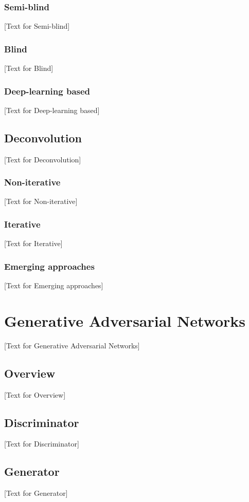 \subsubsection{Semi-blind}
[Text for Semi-blind]

\subsubsection{Blind}
[Text for Blind]

\subsubsection{Deep-learning based}
[Text for Deep-learning based]

\subsection{Deconvolution}
[Text for Deconvolution]

\subsubsection{Non-iterative}
[Text for Non-iterative]

\subsubsection{Iterative}
[Text for Iterative]

\subsubsection{Emerging approaches}
[Text for Emerging approaches]

\section{Generative Adversarial Networks}
[Text for Generative Adversarial Networks]

\subsection{Overview}
[Text for Overview]

\subsection{Discriminator}
[Text for Discriminator]

\subsection{Generator}
[Text for Generator]


